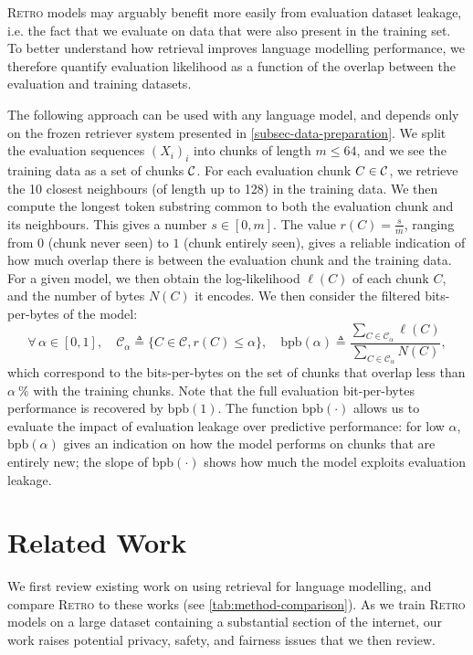 \documentclass[11pt, a4paper, logo]{deepmind}
\newcommand{\retro}{\textsc{Retro}\xspace}
\newcommand{\bpb}{\textrm{bpb}}
\begin{document}
\retro models may arguably benefit more easily from evaluation dataset leakage, i.e. the fact that we evaluate on data that were also present in the training set. To better understand how retrieval improves language modelling performance, we therefore quantify evaluation likelihood as a function of the overlap between the evaluation and training datasets.

The following approach can be used with any language model, and depends only on the frozen retriever system presented in \autoref{subsec-data-preparation}. We split the evaluation sequences ${(X_i)}_i$ into chunks of length $m \le 64$, and we see the training data as a set of chunks $\mathcal{C}$.
For each evaluation chunk $C \in \mathcal{C}$, we retrieve the 10 closest neighbours (of length up to 128) in the training data.
We then compute the longest token substring common to both the evaluation chunk and its neighbours. 
This gives a number $s \in [0, m]$. 
The value $r(C) = \frac{s}{m}$, ranging from $0$ (chunk never seen) to $1$ (chunk entirely seen), gives a reliable indication of how much overlap there is between the evaluation chunk and the training data. 
For a given model, we then obtain the log-likelihood $\ell(C)$ of each chunk $C$, and the number of bytes $N(C)$ it encodes.
We then consider the filtered bits-per-bytes of the model:
\begin{equation}
    \forall\,\alpha \in [0,1],\quad \mathcal{C}_\alpha \triangleq \{ C \in \mathcal{C}, r(C) \leq \alpha \},\quad\textrm{bpb}(\alpha) \triangleq
    \frac{\sum_{C \in \mathcal{C}_\alpha} \ell(C)}{
    \sum_{C \in \mathcal{C}_\alpha} N(C)
    },
\end{equation}
which correspond to the bits-per-bytes on the set of chunks that overlap less than $\alpha\:\%$ with the training chunks. 
Note that the full evaluation bit-per-bytes performance is recovered by $\mathrm{bpb}(1)$. The function $\bpb(\cdot)$ allows us to evaluate the impact of evaluation leakage over predictive performance: for low $\alpha$, $\bpb(\alpha)$ gives an indication on how the model performs on chunks that are entirely new; the slope of $\bpb(\cdot)$ shows how much the model exploits evaluation leakage.


\section{Related Work}
\label{sec-related}

We first review existing work on using retrieval for language modelling, and compare \retro to these works (see \autoref{tab:method-comparison}).
As we train \retro models on a large dataset containing a substantial section of the internet, our work raises potential privacy, safety, and fairness issues that we then review. 
\end{document}
